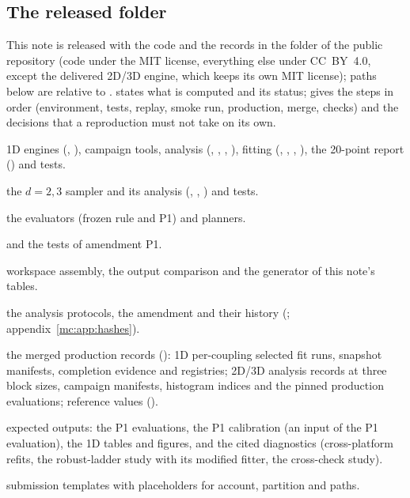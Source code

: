\subsection{The released folder}
This note is released with the code and the records in the  folder of the public repository (code under the MIT license, everything else under CC~BY~4.0, except the delivered 2D/3D
engine, which keeps its own MIT license); paths
below are relative to .  states what is computed and its status;  gives the steps in order
(environment, tests, replay, smoke run, production, merge, checks) and the decisions that a reproduction must not take on its own.
\begin{description}[leftmargin=1.2em,font=\ttfamily]
\item[code/1d/] 1D engines (, ), campaign tools, analysis (, ,
 , ), fitting (, , ,
 ), the 20-point report () and tests.
\item[code/2d3d\_engine/] the $d=2,3$ sampler and its analysis (, ,
 ) and tests.
\item[code/2d/, code/3d/] the evaluators (frozen rule and P1) and planners.
\item[code/reanalysis\_p1/]  and the tests of amendment P1.
\item[code/package\_tools/] workspace assembly, the output comparison and the generator of this note's tables.
\item[protocols/] the analysis protocols, the amendment and their history (; appendix~\ref{mc:app:hashes}).
\item[data/] the merged production records (): 1D per-coupling selected fit runs, snapshot manifests, completion evidence and
 registries; 2D/3D analysis records at three block sizes, campaign manifests, histogram indices and the pinned production evaluations;
 reference values ().
\item[results/] expected outputs: the P1 evaluations, the P1 calibration (an input of the P1 evaluation), the 1D tables and figures, and the
 cited diagnostics (cross-platform refits, the robust-ladder study with its modified fitter, the cross-check study).
\item[slurm/] submission templates with placeholders for account, partition and paths.
\end{description}
